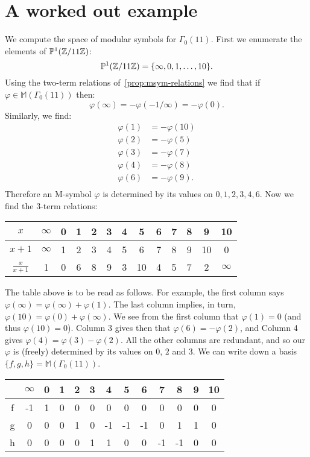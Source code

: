 \section{A worked out example}
We compute the space of modular symbols for $\Gamma_0(11)$. First we enumerate the elements of $\mathbb{P}^1(\mathbb{Z}/11\mathbb{Z})$:
\[
\mathbb{P}^1(\mathbb{Z}/11\mathbb{Z}) = \{\infty,0,1,\ldots,10\}.
\]
Using the two-term relations of~\ref{prop:msym-relations} we find that if $\varphi\in \mathbb{M}(\Gamma_0(11))$ then:
\[
\varphi(\infty) = -\varphi(-1/\infty) = -\varphi(0).
\]
Similarly, we find:
\begin{align*}
\varphi(1)&=-\varphi(10)\\
\varphi(2)&=-\varphi(5)\\
\varphi(3)&=-\varphi(7)\\
\varphi(4)&=-\varphi(8)\\
\varphi(6)&=-\varphi(9).\\
\end{align*}
Therefore an M-symbol $\varphi$ is determined by its values on $0,1,2,3,4,6$. Now we find the $3$-term relations:
\begin{table}[h!]
\begin{tabular}{ccccccccccccc}
\toprule
$x$  &$\infty$&0&1&2&3&4&5&6&7&8&9&10\\
\midrule
$x+1$&$\infty$&1&2&3&4&5&6&7&8&9&10&0\\
$\frac{x}{x+1}$& 1&0&6&8&9&3&10&4&5&7&2&$\infty$\\
\bottomrule
\end{tabular}
\end{table}

The table above is to be read as follows. For example, the first column says $\varphi(\infty)=\varphi(\infty) + \varphi(1)$. The last column implies, in turn, $\varphi(10)=\varphi(0)+\varphi(\infty)$. We see from the first column that $\varphi(1)=0$ (and thus $\varphi(10)=0$). Column 3 gives then that $\varphi(6)=-\varphi(2)$, and Column 4 gives $\varphi(4)=\varphi(3)-\varphi(2)$. All the other columns are redundant, and so our $\varphi$ is (freely) determined by its values on $0$, $2$ and $3$. We can write down a basis $\{f,g,h\}=\mathbb{M}(\Gamma_0(11))$.
\begin{table}[h!]
\begin{centering}
\begin{tabular}{ccccccccccccc}
\toprule
  &$\infty$&0&1&2&3&4&5&6&7&8&9&10\\
\midrule
f&-1&1&0&0&0&0&0&0&0&0&0&0\\
g&0&0&0&1&0&-1&-1&-1&0&1&1&0\\
h&0&0&0&0&1&1&0&0&-1&-1&0&0\\
\bottomrule
\end{tabular}
\end{centering}
\end{table}

